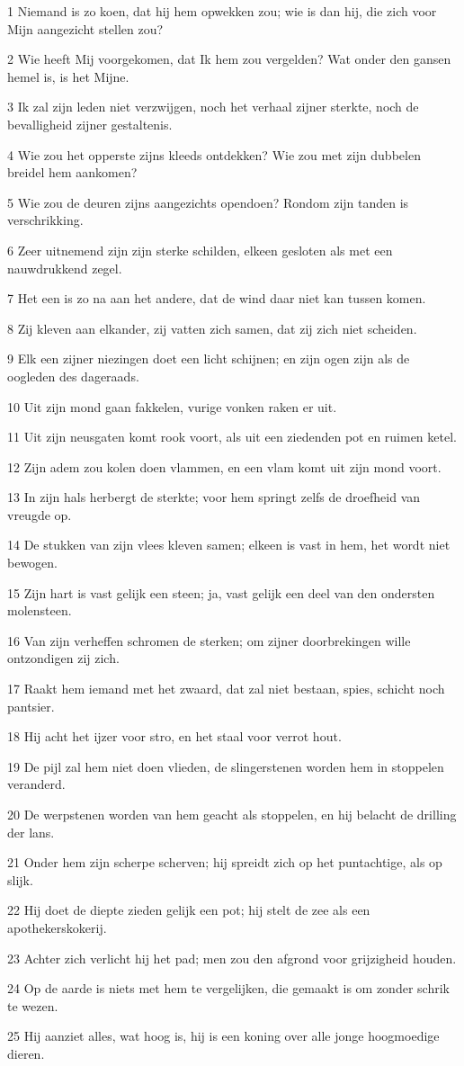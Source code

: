 \par 1 Niemand is zo koen, dat hij hem opwekken zou; wie is dan hij, die zich voor Mijn aangezicht stellen zou?
\par 2 Wie heeft Mij voorgekomen, dat Ik hem zou vergelden? Wat onder den gansen hemel is, is het Mijne.
\par 3 Ik zal zijn leden niet verzwijgen, noch het verhaal zijner sterkte, noch de bevalligheid zijner gestaltenis.
\par 4 Wie zou het opperste zijns kleeds ontdekken? Wie zou met zijn dubbelen breidel hem aankomen?
\par 5 Wie zou de deuren zijns aangezichts opendoen? Rondom zijn tanden is verschrikking.
\par 6 Zeer uitnemend zijn zijn sterke schilden, elkeen gesloten als met een nauwdrukkend zegel.
\par 7 Het een is zo na aan het andere, dat de wind daar niet kan tussen komen.
\par 8 Zij kleven aan elkander, zij vatten zich samen, dat zij zich niet scheiden.
\par 9 Elk een zijner niezingen doet een licht schijnen; en zijn ogen zijn als de oogleden des dageraads.
\par 10 Uit zijn mond gaan fakkelen, vurige vonken raken er uit.
\par 11 Uit zijn neusgaten komt rook voort, als uit een ziedenden pot en ruimen ketel.
\par 12 Zijn adem zou kolen doen vlammen, en een vlam komt uit zijn mond voort.
\par 13 In zijn hals herbergt de sterkte; voor hem springt zelfs de droefheid van vreugde op.
\par 14 De stukken van zijn vlees kleven samen; elkeen is vast in hem, het wordt niet bewogen.
\par 15 Zijn hart is vast gelijk een steen; ja, vast gelijk een deel van den ondersten molensteen.
\par 16 Van zijn verheffen schromen de sterken; om zijner doorbrekingen wille ontzondigen zij zich.
\par 17 Raakt hem iemand met het zwaard, dat zal niet bestaan, spies, schicht noch pantsier.
\par 18 Hij acht het ijzer voor stro, en het staal voor verrot hout.
\par 19 De pijl zal hem niet doen vlieden, de slingerstenen worden hem in stoppelen veranderd.
\par 20 De werpstenen worden van hem geacht als stoppelen, en hij belacht de drilling der lans.
\par 21 Onder hem zijn scherpe scherven; hij spreidt zich op het puntachtige, als op slijk.
\par 22 Hij doet de diepte zieden gelijk een pot; hij stelt de zee als een apothekerskokerij.
\par 23 Achter zich verlicht hij het pad; men zou den afgrond voor grijzigheid houden.
\par 24 Op de aarde is niets met hem te vergelijken, die gemaakt is om zonder schrik te wezen.
\par 25 Hij aanziet alles, wat hoog is, hij is een koning over alle jonge hoogmoedige dieren.

